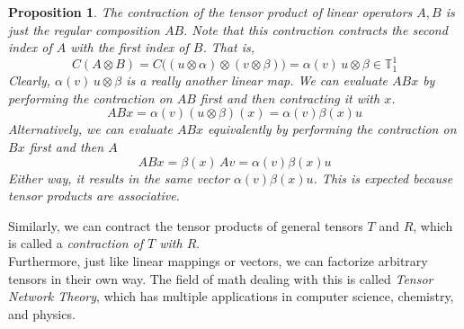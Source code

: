 \documentclass{article}
\newtheorem{proposition}[theorem]{Proposition}
\theoremstyle{remark}
\theoremstyle{definition}
\begin{document}
\begin{proposition}
The contraction of the tensor product of linear operators $A, B$ is just the regular composition $A B$. Note that this contraction contracts the second index of $A$ with the first index of $B$. That is, 
\[C(A \otimes B) = C\big( (u \otimes \alpha) \otimes (v \otimes \beta) \big) = \alpha(v) \, u \otimes \beta \in \mathbb{T}^1_1\]
Clearly, $\alpha(v) \, u \otimes \beta$ is a really another linear map. We can evaluate $A B x$ by performing the contraction on $A B$ first and then contracting it with $x$. 
\[A B x = \alpha (v) (u \otimes \beta) (x) = \alpha (v) \beta(x) u \]
Alternatively, we can evaluate $A B x$ equivalently by performing the contraction on $B x$ first and then $A$ 
\[A B x = \beta (x)\, A v = \alpha(v) \beta(x) u\]
Either way, it results in the same vector $\alpha (v) \beta (x) u$. This is expected because tensor products are associative. 
\end{proposition}

Similarly, we can contract the tensor products of general tensors $T$ and $R$, which is called a \textit{contraction of $T$ with $R$}. 
\\

Furthermore, just like linear mappings or vectors, we can factorize arbitrary tensors in their own way. The field of math dealing with this is called \textit{Tensor Network Theory}, which has multiple applications in computer science, chemistry, and physics. 
\end{document}
